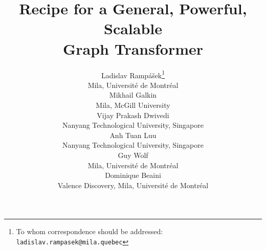 \documentclass{article}
\title{Recipe for a General, Powerful, Scalable\\ Graph Transformer}
\author{%
   Ladislav Rampášek\thanks{To whom correspondence should be addressed: \texttt{ladislav.rampasek@mila.quebec}} \\
   Mila, Université de Montréal \\
   \And
   Mikhail Galkin \\
   Mila, McGill University \\
   \AND
   Vijay Prakash Dwivedi \\
   Nanyang Technological University, Singapore \\
   \And
   Anh Tuan Luu \\
   Nanyang Technological University, Singapore \\
   \And
   Guy Wolf \\
   Mila, Université de Montréal \\
   \And
   Dominique Beaini \\
   Valence Discovery, Mila, Université de Montréal \\
}
\begin{document}
\newcommand{\mycomment}[3]{\textcolor{#1}{[\textbf{#2:} #3]}}
\newcommand{\lr}[1]{\mycomment{orange}{LR}{#1}}
\newcommand{\db}[1]{\mycomment{magenta}{DB}{#1}}
\newcommand{\mg}[1]{\mycomment{green!70!black}{MG}{#1}}
\newcommand{\draft}[1]{\textcolor{blue}{#1}}
\newcommand{\vd}[1]{\textcolor{purpleheart}{#1}} %

\newcommand{\myparagraph}[1]{\noindent\textbf{#1}}


\newcommand{\first}[1]{\textbf{\textcolor{dark2green}{#1}}}
\newcommand{\second}[1]{\textbf{\textcolor{dark2orange}{#1}}}
\newcommand{\third}[1]{\textbf{\textcolor{dark2purple}{#1}}}

\newcommand{\method}{GPS\xspace}
\newcommand{\gtgym}{\textsc{GraphGPS}\xspace}

\newcommand{\PE}{\textcolor{pe_color}{PE}\xspace}
\newcommand{\SE}{\textcolor{se_color}{SE}\xspace}


\maketitle
\setcounter{footnote}{0}
\end{document}
